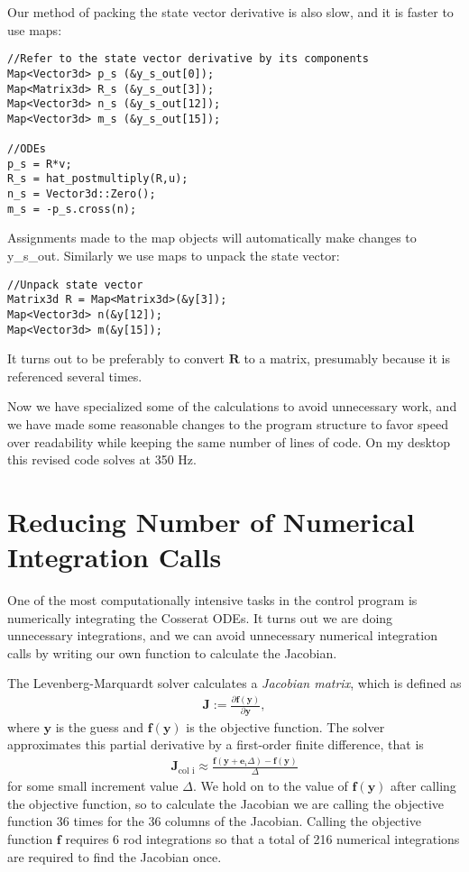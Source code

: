 \documentclass[12pt]{article}
\begin{document}
\newpage
\noindent Our method of packing the state vector derivative is also slow, and it is faster to use maps:
\begin{lstlisting}
//Refer to the state vector derivative by its components
Map<Vector3d> p_s (&y_s_out[0]);
Map<Matrix3d> R_s (&y_s_out[3]);
Map<Vector3d> n_s (&y_s_out[12]);
Map<Vector3d> m_s (&y_s_out[15]);

//ODEs
p_s = R*v;
R_s = hat_postmultiply(R,u);
n_s = Vector3d::Zero();
m_s = -p_s.cross(n);
\end{lstlisting}
Assignments made to the map objects will automatically make changes to y\_s\_out. Similarly we use maps to unpack the state vector:
\begin{lstlisting}
//Unpack state vector
Matrix3d R = Map<Matrix3d>(&y[3]);
Map<Vector3d> n(&y[12]);
Map<Vector3d> m(&y[15]);
\end{lstlisting}
It turns out to be preferably to convert $\boldsymbol{R}$ to a matrix, presumably because it is referenced several times.

Now we have specialized some of the calculations to avoid unnecessary work, and we have made some reasonable changes to the program structure to favor speed over readability while keeping the same number of lines of code. On my desktop this revised code solves at 350 Hz.

\section{Reducing Number of Numerical Integration Calls}

One of the most computationally intensive tasks in the control program is numerically integrating the Cosserat ODEs. It turns out we are doing unnecessary integrations, and we can avoid unnecessary numerical integration calls by writing our own function to calculate the Jacobian.

The Levenberg-Marquardt solver calculates a \emph{Jacobian matrix}, which is defined as
\begin{align*}
\boldsymbol{J} := \frac{\partial \boldsymbol{f}(\boldsymbol{y})}{\partial \boldsymbol{y}},
\end{align*}
where $\boldsymbol{y}$ is the guess and $\boldsymbol{f}(\boldsymbol{y})$ is the objective function. The solver approximates this partial derivative by a first-order finite difference, that is
\begin{align*}
\boldsymbol{J}_\text{col i} \approx \frac{\boldsymbol{f}(\boldsymbol{y} + \boldsymbol{e}_i \Delta) - \boldsymbol{f}(\boldsymbol{y})}{\Delta}
\end{align*}
for some small increment value $\Delta$. We hold on to the value of $\boldsymbol{f}(\boldsymbol{y})$ after calling the objective function, so to calculate the Jacobian we are calling the objective function 36 times for the 36 columns of the Jacobian. Calling the objective function $\boldsymbol{f}$ requires 6 rod integrations so that a total of 216 numerical integrations are required to find the Jacobian once.
\end{document}

